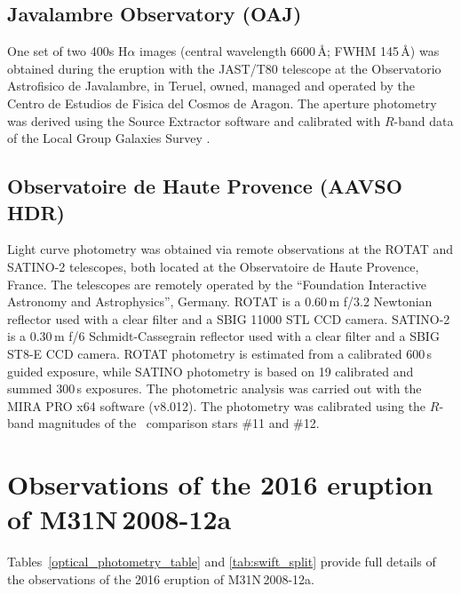 \documentclass[twocolumn,tighten]{aastex6}
\def\novak{{M31N\,2008-12a}}
\newcommand{\othreek}{\citetalias{2016ApJ...833..149D}}
\begin{document}
\subsection{Javalambre Observatory (OAJ)}

One set of two 400s H$\alpha$ images (central wavelength 6600\,\AA; FWHM 145\,\AA) was obtained during the eruption with the JAST/T80 telescope at the Observatorio Astrofisico de Javalambre, in Teruel, owned, managed and operated by the Centro de Estudios de Fisica del Cosmos de Aragon. The aperture photometry was derived using the Source Extractor software \citep[v2.8.6;][]{1996A&AS..117..393B} and calibrated with $R$-band data of the Local Group Galaxies Survey \citep{2006AJ....131.2478M}.

\subsection{Observatoire de Haute Provence (AAVSO HDR)}

Light curve photometry was obtained via remote observations at the ROTAT and SATINO-2 telescopes, both located at the Observatoire de Haute Provence, France. The telescopes are remotely operated by the ``Foundation Interactive Astronomy and Astrophysics'', Germany. ROTAT is a 0.60\,m f/3.2 Newtonian reflector used with a clear filter and a SBIG 11000 STL CCD camera. SATINO-2 is a 0.30\,m f/6 Schmidt-Cassegrain reflector used with a clear filter and a SBIG ST8-E CCD camera. ROTAT photometry is estimated from a calibrated 600\,s guided exposure, while SATINO photometry is based on 19 calibrated and summed 300\,s exposures. The photometric analysis was carried out with the MIRA PRO x64 software (v8.012). The photometry was calibrated using the $R$-band magnitudes of the \othreek\ comparison stars \#11 and \#12.

\newpage

\section{Observations of the 2016 eruption of \novak}

Tables~\ref{optical_photometry_table} and \ref{tab:swift_split} provide full details of the observations of the 2016 eruption of \novak.
\end{document}
